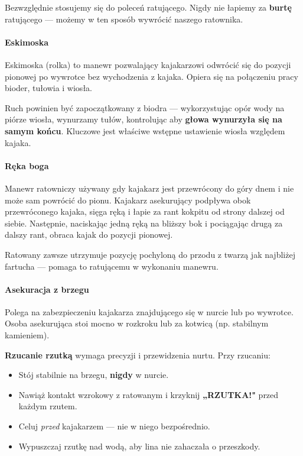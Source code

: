 \begin{tipbox}
  Bezwzględnie stosujemy się do poleceń ratującego. Nigdy nie łapiemy za \textbf{burtę} ratującego — możemy w ten sposób wywrócić naszego ratownika.
\end{tipbox}

\paragraph{Eskimoska}

Eskimoska (rolka) to manewr pozwalający kajakarzowi odwrócić się do pozycji pionowej
po wywrotce bez wychodzenia z kajaka. Opiera się na połączeniu pracy bioder, tułowia
i wiosła.

Ruch powinien być zapoczątkowany z biodra — wykorzystując opór wody na piórze wiosła,
wynurzamy tułów, kontrolując aby \textbf{głowa wynurzyła się na samym końcu}. Kluczowe jest
właściwe wstępne ustawienie wiosła względem kajaka.

\paragraph{Ręka boga}

Manewr ratowniczy używany gdy kajakarz jest przewrócony do góry dnem i nie może sam powrócić
do pionu. Kajakarz asekurujący podpływa obok przewróconego kajaka, sięga ręką i łapie za
rant kokpitu od strony dalszej od siebie. Następnie, naciskając jedną ręką na bliższy bok
i pociągając drugą za dalszy rant, obraca kajak do pozycji pionowej.

Ratowany zawsze utrzymuje pozycję pochyloną do przodu z twarzą jak najbliżej fartucha —
pomaga to ratującemu w wykonaniu manewru.

\paragraph{Asekuracja z brzegu}

Polega na zabezpieczeniu kajakarza znajdującego się w nurcie lub po wywrotce. Osoba
asekurująca stoi mocno w rozkroku lub za kotwicą (np. stabilnym kamieniem).

\textbf{Rzucanie rzutką} wymaga precyzji i przewidzenia nurtu. Przy rzucaniu:

\begin{itemize}[leftmargin=1.5em, itemsep=2pt]
  \item Stój stabilnie na brzegu, \textbf{nigdy} w nurcie.
  \item Nawiąż kontakt wzrokowy z ratowanym i krzyknij \textbf{„RZUTKA!"}
    przed każdym rzutem.
  \item Celuj \emph{przed} kajakarzem — nie w niego bezpośrednio.
  \item Wypuszczaj rzutkę nad wodą, aby lina nie zahaczała o przeszkody.
\end{itemize}

